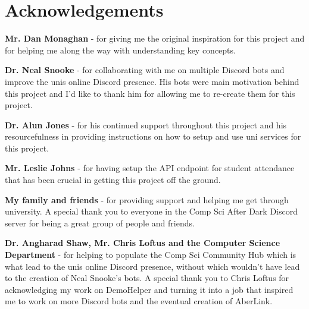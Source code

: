 \thispagestyle{empty}


\section*{\centering Acknowledgements}

\textbf{Mr. Dan Monaghan} - for giving me the original inspiration for this project and for helping me along the way with understanding key concepts. 

\textbf{Dr. Neal Snooke} - for collaborating with me on multiple Discord bots and improve the unis online Discord presence. His bots were main motivation behind this project and I'd like to thank him for allowing me to re-create them for this project.

\textbf{Dr. Alun Jones} - for his continued support throughout this project and his resourcefulness in providing instructions on how to setup and use  uni services for this project.

\textbf{Mr. Leslie Johns} - for having setup the API endpoint for student attendance that has been crucial in getting this project off the ground.

\textbf{My family and friends} - for providing support and helping me get through university. A special thank you to everyone in the Comp Sci After Dark Discord server for being a great group of people and friends. 

\textbf{Dr. Angharad Shaw, Mr. Chris Loftus and the Computer Science Department} - for helping to populate the Comp Sci Community Hub which is what lead to the unis online Discord presence, without which wouldn't have lead to the creation of Neal Snooke's bots. A special thank you to Chris Loftus for acknowledging my work on DemoHelper and turning it into a job that inspired me to work on more Discord bots and the eventual creation of AberLink.
